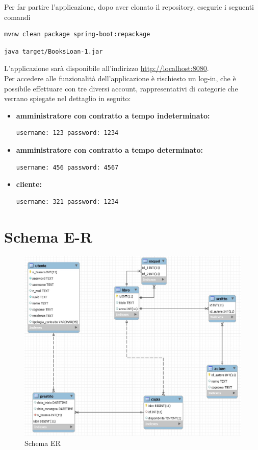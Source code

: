 \documentclass[a4paper,10pt]{article}
\begin{document}
Per far partire l'applicazione, dopo aver clonato il repository, esegurie i seguenti comandi

\begin{lstlisting}[language=bash]
	mvnw clean package spring-boot:repackage
\end{lstlisting}

\begin{lstlisting}[language=bash]
	java target/BooksLoan-1.jar
\end{lstlisting}

L'applicazione sarà disponibile all'indirizzo \href{http://localhost:8080}{http://localhost:8080}.\\

Per accedere alle funzionalità dell'applicazione è rischiesto un log-in, che è possibile effettuare con tre diversi account, rappresentativi di categorie che verrano spiegate nel dettaglio in seguito:

\begin{itemize}
	\item \textbf{amministratore con contratto a tempo indeterminato:}
\begin{lstlisting}[language=bash]
    username: 123 password: 1234
\end{lstlisting}
	\item \textbf{amministratore con contratto a tempo determinato:}
\begin{lstlisting}[language=bash]
    username: 456 password: 4567
\end{lstlisting}
	\item \textbf{cliente:}
\begin{lstlisting}[language=bash]
    username: 321 password: 1234
\end{lstlisting}
\end{itemize}

\section*{Schema E-R}

\begin{figure}[H]
	\centering
	\includegraphics[width=0.7\linewidth]{images/ERdiagram}
	\caption[Schema ER]{Schema ER}
	\label{fig:re}
\end{figure}
\end{document}
